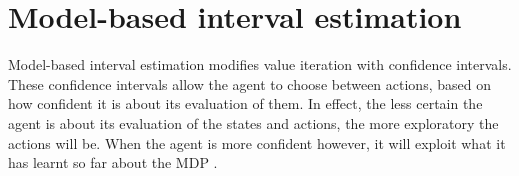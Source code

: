 \section{Model-based interval estimation}
\label{sec:mbie}

Model-based interval estimation modifies value iteration with confidence
intervals. These confidence intervals allow the agent to choose between
actions, based on how confident it is about its evaluation of them. In effect,
the less certain the agent is about its evaluation of the states and actions,
the more exploratory the actions will be. When the agent is more confident
however, it will exploit what it has learnt so far about the MDP
\parencite{dietterich2013pac}.




